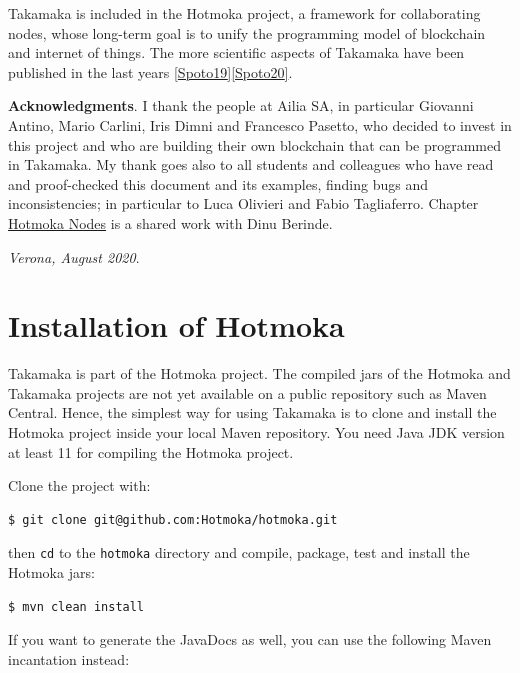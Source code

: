 \documentclass[a4paper,]{book}
\begin{document}
{Takamaka is included in the Hotmoka project, a framework for
collaborating nodes, whose long-term goal is to unify the programming
model of blockchain and internet of things. The more scientific aspects
of Takamaka have been published in the last years
\protect\hyperlink{Spoto19}{{[}Spoto19{]}}\protect\hyperlink{Spoto20}{{[}Spoto20{]}}.

\textbf{Acknowledgments}. I thank the people at Ailia SA, in particular
Giovanni Antino, Mario Carlini, Iris Dimni and Francesco Pasetto, who
decided to invest in this project and who are building their own
blockchain that can be programmed in Takamaka. My thank goes also to all
students and colleagues who have read and proof-checked this document
and its examples, finding bugs and inconsistencies; in particular to
Luca Olivieri and Fabio Tagliaferro. Chapter
\protect\hyperlink{hotmoka-nodes}{Hotmoka Nodes} is a shared work with
Dinu Berinde.

\emph{Verona, August 2020}.

\hypertarget{installation-of-hotmoka}{%
\chapter{Installation of Hotmoka }\label{installation-of-hotmoka}}

Takamaka is part of the Hotmoka project. The compiled jars of the
Hotmoka and Takamaka projects are not yet available on a public
repository such as Maven Central. Hence, the simplest way for using
Takamaka is to clone and install the Hotmoka project inside your local
Maven repository. You need Java JDK version at least 11 for compiling
the Hotmoka project.

Clone the project with:

\begin{myverbatim}
\begin{verbatim}
$ git clone git@github.com:Hotmoka/hotmoka.git
\end{verbatim}
\end{myverbatim}

then \texttt{cd} to the \texttt{hotmoka} directory and compile, package,
test and install the Hotmoka jars:

\begin{myverbatim}
\begin{verbatim}
$ mvn clean install
\end{verbatim}
\end{myverbatim}

If you want to generate the JavaDocs as well, you can use the following
Maven incantation instead:

}
\end{document}
